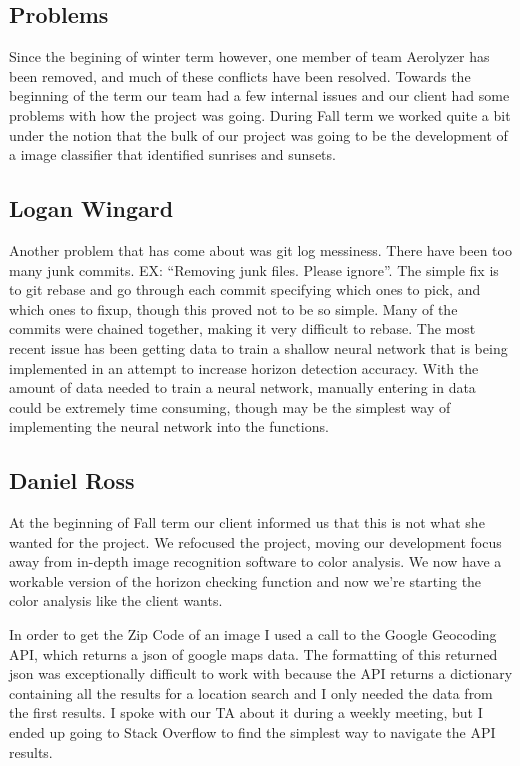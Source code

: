 \documentclass[onecolumn, draftclsnofoot,10pt, compsoc]{IEEEtran}
\begin{document}
\begin{singlespace}
	\section{Problems}
		Since the begining of winter term however, one member of team Aerolyzer has been removed, and much of these conflicts have been resolved.
		Towards the beginning of the term our team had a few internal issues and our client had some problems with how the project was going.
		During Fall term we worked quite a bit under the notion that the bulk of our project was going to be the development of a image classifier that identified sunrises and sunsets.
		\subsection{Logan Wingard}
			Another problem that has come about was git log messiness.
			There have been too many junk commits.
            EX: ``Removing junk files. Please ignore''.
			The simple fix is to git rebase and go through each commit specifying which ones to pick, and which ones to fixup, though this proved not to be so simple.
			Many of the commits were chained together, making it very difficult to rebase.
			The most recent issue has been getting data to train a shallow neural network that is being implemented in an attempt to increase horizon detection accuracy.
			With the amount of data needed to train a neural network, manually entering in data could be extremely time consuming, though may be the simplest way of implementing the neural network into the functions.
		\subsection{Daniel Ross}
			At the beginning of Fall term our client informed us that this is not what she wanted for the project.
			We refocused the project, moving our development focus away from in-depth image recognition software to color analysis.
			We now have a workable version of the horizon checking function and now we're starting the color analysis like the client wants.

			In order to get the Zip Code of an image I used a call to the Google Geocoding API, which returns a json of google maps data.
			The formatting of this returned json was exceptionally difficult to work with because the API returns a dictionary containing all the results for a location search and I only needed the data from the first results.
			I spoke with our TA about it during a weekly meeting, but I ended up going to Stack Overflow to find the simplest way to navigate the API results.
		

\end{singlespace}
\end{document}
